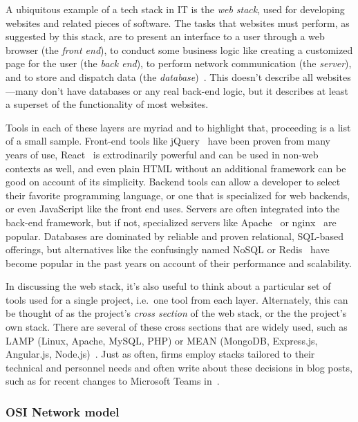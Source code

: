 \documentclass[english,12pt,a4paper,pdftex,eng,utf8]{aaltothesis}
\begin{document}
A ubiquitous example of a tech stack in IT is the {\it web stack}, used for developing websites and related pieces of software.  The tasks that websites must perform, as suggested by this stack, are to present an interface to a user through a web browser (the {\it front end\/}), to conduct some business logic like creating a customized page for the user (the {\it back end\/}), to perform network communication (the {\it server\/}), and to store and dispatch data (the {\it database\/})~\cite{PranamStack2017}.  This doesn't describe all websites---many don't have databases or any real back-end logic, but it describes at least a superset of the functionality of most websites.

Tools in each of these layers are myriad and to highlight that, proceeding is a list of a small sample.  Front-end tools like jQuery~\cite{jQuery} have been proven from many years of use, React~\cite{React} is extrodinarily powerful and can be used in non-web contexts as well, and even plain HTML without an additional framework can be good on account of its simplicity.  Backend tools can allow a developer to select their favorite programming language, or one that is specialized for web backends, or even JavaScript like the front end uses.  Servers are often integrated into the back-end framework, but if not, specialized servers like Apache~\cite{ApacheServer} or nginx~\cite{nginx} are popular.  Databases are dominated by reliable and proven relational, SQL-based offerings, but alternatives like the confusingly named NoSQL or Redis~\cite{redis} have become popular in the past years on account of their performance and scalability.

In discussing the web stack, it's also useful to think about a particular set of tools used for a single project, i.e.\ one tool from each layer.  Alternately, this can be thought of as the project's {\it cross section\/} of the web stack, or the the project's own stack.  There are several of these cross sections that are widely used, such as LAMP (Linux, Apache, MySQL, PHP) or MEAN (MongoDB, Express.js, Angular.js, Node.js)~\cite{PranamStack2017}.  Just as often, firms employ stacks tailored to their technical and personnel needs and often write about these decisions in blog posts, such as for recent changes to Microsoft Teams in~\cite{Singh2023}.

\subsubsection{OSI Network model}
\end{document}
